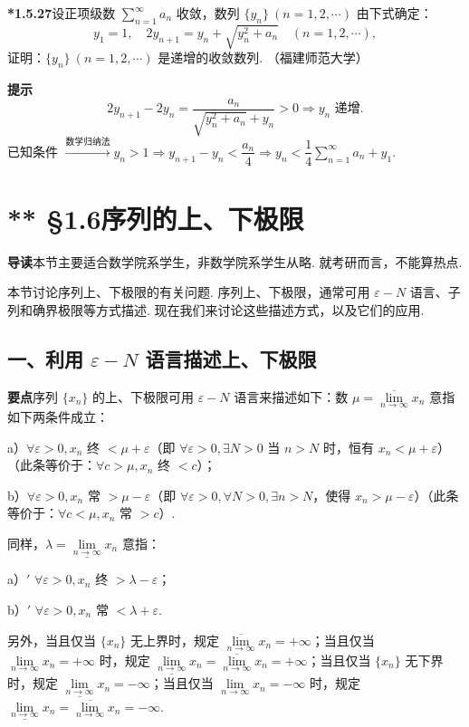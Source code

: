 \documentclass[UTF8,12pt,a4paper,fontset=fandol]{ctexart}
\begin{document}
\noindent\textbf{*1.5.27}\quad 设正项级数 $\sum\limits_{n=1}^{\infty}a_n$ 收敛，数列 $\{y_n\}\ (n=1,2,\cdots)$ 由下式确定：
\[
  y_1=1,\quad 2y_{n+1}=y_n+\sqrt{y_n^2+a_n}\quad (n=1,2,\cdots),
\]
证明：$\{y_n\}\ (n=1,2,\cdots)$ 是递增的收敛数列. （福建师范大学）

\noindent\textbf{提示}\quad
\[
  2y_{n+1}-2y_n=\frac{a_n}{\sqrt{y_n^2+a_n}+y_n}>0\Rightarrow y_n\text{ 递增}.
\]
已知条件 $\xrightarrow{\text{数学归纳法}} y_n>1\Rightarrow y_{n+1}-y_n<\dfrac{a_n}{4}\Rightarrow y_n<\dfrac14\sum\limits_{n=1}^{\infty}a_n+y_1$.

\section*{** §1.6\quad 序列的上、下极限}

\noindent\textbf{导读}\quad 本节主要适合数学院系学生，非数学院系学生从略. 就考研而言，不能算热点.

本节讨论序列上、下极限的有关问题. 序列上、下极限，通常可用 $\varepsilon-N$ 语言、子列和确界极限等方式描述. 现在我们来讨论这些描述方式，以及它们的应用.

\subsection*{一、利用 $\varepsilon-N$ 语言描述上、下极限}

\noindent\textbf{要点}\quad 序列 $\{x_n\}$ 的上、下极限可用 $\varepsilon-N$ 语言来描述如下：数 $\mu=\overline{\lim\limits_{n\to\infty}}x_n$ 意指如下两条件成立：

a）$\forall \varepsilon>0,x_n$ 终 $<\mu+\varepsilon$（即 $\forall \varepsilon>0,\exists N>0$ 当 $n>N$ 时，恒有 $x_n<\mu+\varepsilon$）（此条等价于：$\forall c>\mu,x_n$ 终 $<c$）；

b）$\forall \varepsilon>0,x_n$ 常 $>\mu-\varepsilon$（即 $\forall \varepsilon>0,\forall N>0,\exists n>N$，使得 $x_n>\mu-\varepsilon$）（此条等价于：$\forall c<\mu,x_n$ 常 $>c$）.

同样，$\lambda=\underline{\lim\limits_{n\to\infty}}x_n$ 意指：

a）$'$ $\forall \varepsilon>0,x_n$ 终 $>\lambda-\varepsilon$；

b）$'$ $\forall \varepsilon>0,x_n$ 常 $<\lambda+\varepsilon$.

另外，当且仅当 $\{x_n\}$ 无上界时，规定 $\overline{\lim\limits_{n\to\infty}}x_n=+\infty$；当且仅当 $\lim\limits_{n\to\infty}x_n=+\infty$ 时，规定 $\underline{\lim\limits_{n\to\infty}}x_n=\overline{\lim\limits_{n\to\infty}}x_n=+\infty$；当且仅当 $\{x_n\}$ 无下界时，规定 $\underline{\lim\limits_{n\to\infty}}x_n=-\infty$；当且仅当 $\lim\limits_{n\to\infty}x_n=-\infty$ 时，规定 $\underline{\lim\limits_{n\to\infty}}x_n=\overline{\lim\limits_{n\to\infty}}x_n=-\infty$.
\end{document}
